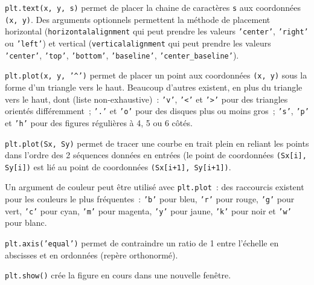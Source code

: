 \texttt{plt.text(x, y, s)} permet de placer la chaine de caractères \texttt{s} aux coordonnées \texttt{(x, y)}. Des arguments optionnels permettent la méthode de placement horizontal (\texttt{horizontalalignment} qui peut prendre les valeurs \texttt{'center'}, \texttt{'right'} ou \texttt{'left'}) et vertical (\texttt{verticalalignment} qui peut prendre les valeurs \texttt{'center'}, \texttt{'top'}, \texttt{'bottom'}, \texttt{'baseline'}, \texttt{'center\_baseline'}).

\texttt{plt.plot(x, y, '\textasciicircum')} permet de placer un point aux coordonnées \texttt{(x, y)} sous la forme d'un triangle vers le haut. Beaucoup d'autres existent, en plus du triangle vers le haut, dont (liste non-exhaustive)~: \texttt{'v'}, \texttt{'<'} et \texttt{'>'} pour des triangles orientés différemment~; \texttt{'.'} et \texttt{'o'} pour des disques plus ou moins gros~; \texttt{'s'}, \texttt{'p'} et \texttt{'h'} pour des figures régulières à 4, 5 ou 6 côtés. 

\texttt{plt.plot(Sx, Sy)} permet de tracer une courbe en trait plein en reliant les points dans l'ordre des 2 séquences données en entrées (le point de coordonnées \texttt{(Sx[i], Sy[i])} est lié au point de coordonnées \texttt{(Sx[i+1], Sy[i+1])}.

Un argument de couleur peut être utilisé avec \texttt{plt.plot}~: des raccourcis existent pour les couleurs le plus fréquentes~: \texttt{'b'} pour bleu, \texttt{'r'} pour rouge, \texttt{'g'} pour vert, \texttt{'c'} pour cyan, \texttt{'m'} pour magenta, \texttt{'y'} pour jaune, \texttt{'k'} pour noir et \texttt{'w'} pour blanc. 

\texttt{plt.axis('equal')} permet de contraindre un ratio de 1 entre l'échelle en abscisses et en ordonnées (repère orthonormé).

\texttt{plt.show()} crée la figure en cours dans une nouvelle fenêtre. 
 







